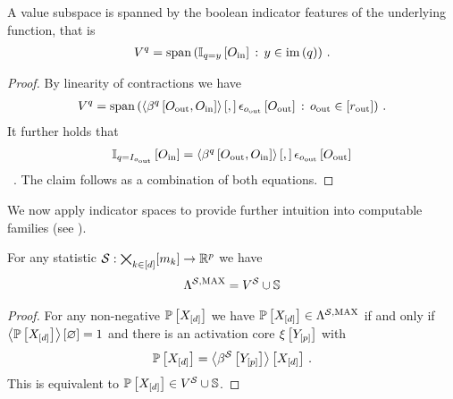 \begin{lemma}
    A value subspace is spanned by the boolean indicator features of the underlying function, that is
    \begin{align*}
        V^{q}
        = \mathrm{span}\left(\mathbb{I}_{q=y}\left[O_{\mathrm{in}}\right] \,:\, y\in\mathrm{im}\left(q\right)\right) \, .
    \end{align*}
\end{lemma}
\begin{proof}
    By linearity of contractions we have
    \begin{align*}
        V^{q} = \mathrm{span}\left(
            \left\langle \beta^{q}\left[O_{\mathrm{out}},O_{\mathrm{in}}\right]\right\rangle \left[ , \right] \epsilon_{o_{\mathrm{out}}}\left[O_{\mathrm{out}}\right]
            \,:\, o_{\mathrm{out}} \in [r_{\mathrm{out}}]
        \right) \, .
    \end{align*}
    It further holds that
    \begin{align*}
        \mathbb{I}_{q=I_{o_{\mathrm{out}}}}\left[O_{\mathrm{in}}\right]
        = \left\langle \beta^{q}\left[O_{\mathrm{out}},O_{\mathrm{in}}\right]\right\rangle \left[ , \right] \epsilon_{o_{\mathrm{out}}}\left[O_{\mathrm{out}}\right]
    \end{align*} \, .
    The claim follows as a combination of both equations.
\end{proof}






We now apply indicator spaces to provide further intuition into computable families (see ).


\begin{lemma}
    For any statistic $\mathcal{S} : \bigtimes_{k\in[d]}[m_{k}]\rightarrow\mathbb{R}^{p}$ we have
    \begin{align*}
        \Lambda^{\mathcal{S},\mathrm{MAX}} = V^{\mathcal{S}} \cup \mathbb{S}
    \end{align*}
\end{lemma}
\begin{proof}
    For any non-negative $\mathbb{P}\left[X_{[d]}\right]$ we have $\mathbb{P}\left[X_{[d]}\right]\in\Lambda^{\mathcal{S},\mathrm{MAX}}$ if and only if $\left\langle \mathbb{P}\left[X_{[d]}\right]\right\rangle \left[ \varnothing \right]=1$ and there is an activation core $\xi\left[Y_{[p]}\right]$ with
    \begin{align*}
        \mathbb{P}\left[X_{[d]}\right] = \left\langle \beta^{\mathcal{S}}\left[Y_{[p]}\right]\right\rangle \left[ X_{[d]} \right] \, .
    \end{align*}
    This is equivalent to $\mathbb{P}\left[X_{[d]}\right]\in V^{\mathcal{S}} \cup \mathbb{S}$.
\end{proof}

